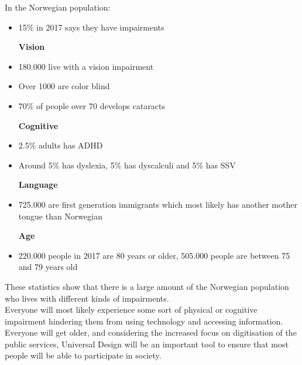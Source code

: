 \noindent
In the Norwegian population:
\begin{itemize}
    \item 15\% in 2017 says they have impairments \parencite{barne-_ungdoms-_og_familiedirektoratet_antall_2017}
    \item [\textbf{Vision}]
        \item 180.000 live with a vision impairment \parencite{blindeforbundet_fakta_????}
        \item Over 1000 are color blind \parencite{blindeforbundet_fakta_????}
        \item 70\% of people over 70 develops cataracts \parencite{blindeforbundet_fakta_????}
    \item [\textbf{Cognitive}]
        \item 2.5\% adults has ADHD \parencite{adhd_norge_voksen_????}
        \item Around 5\% has dyslexia, 5\% has dyscalculi and 5\% has SSV \parencite{dysleksi_norge_fagstoff_????}
    \item [\textbf{Language}]
        \item 725.000 are first generation immigrants which most likely has another mother tongue than Norwegian \parencite{statistisk_sentralbyra_nokkeltall_2017}
    \item [\textbf{Age}]
        \item 220.000 people in 2017 are 80 years or older, 505.000 people are between 75 and 79 years old \parencite{folkehelseinstituttet_andelen_2017}
\end{itemize}
These statistics show that there is a large amount of the Norwegian population who lives with different kinds of impairments. \\

\noindent
Everyone will most likely experience some sort of physical or cognitive impairment \parencite{world_health_organization_world_2011} hindering them from using technology and accessing information. Everyone will get older, and considering the increased focus on digitisation of the public services, Universal Design will be an important tool to ensure that most people will be able to participate in society. 



